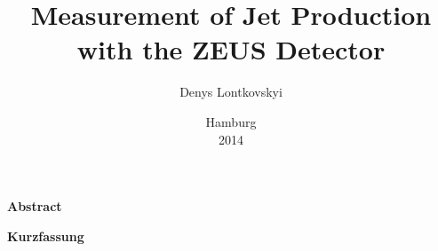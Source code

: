 \documentclass[12pt,a4paper,reqno,twoside,final]{scrbook}%
\numberwithin{equation}{subsection}
\begin{document}
\title{Measurement of Jet Production with the ZEUS Detector}
\author{Denys Lontkovskyi}
\date{Hamburg\\2014}
\dedication{To my family}

 \thispagestyle{empty} %
 
 \titlePAGE %
 \newpage
 \thispagestyle{empty}
 \titelGUTACHTERS
 \newpage

\begin{center}
\textbf{Abstract}
\end{center}


\newpage

\begin{center}
\textbf{Kurzfassung}
\end{center}


\newpage
\thispagestyle{empty}
\vspace*{8\baselineskip}{%
\begin{flushright}
To my family
\end{flushright}%
\par}
\newpage

\tableofcontents

\mainmatter


\end{document}
